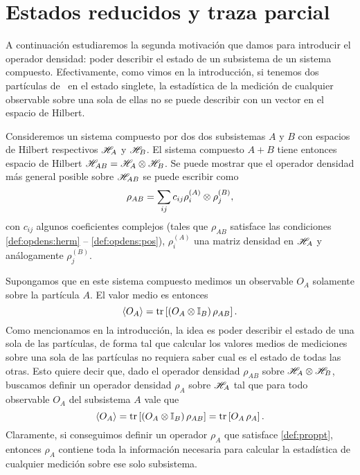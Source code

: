 \documentclass[10pt, a4paper]{article}
\numberwithin{equation}{subsection}
\begin{document}
\bigbreak


\bigbreak


\section{Estados reducidos y traza parcial}
A continuación estudiaremos la segunda motivación que damos para introducir el
operador densidad: poder describir el estado de un subsistema de un sistema
compuesto. Efectivamente, como vimos en la introducción, si tenemos dos
partículas de \spinhalf~en el estado singlete, la estadística de la medición de
cualquier observable sobre una sola de ellas no se puede describir con un
vector en el espacio de Hilbert.

Consideremos un sistema compuesto por dos dos subsistemas $A$ y $B$ con
espacios de Hilbert respectivos $\mathscr{H}_A$ y $\mathscr{H}_B$. El sistema
compuesto $A+B$ tiene entonces espacio de Hilbert $\mathscr{H}_{AB} =
\mathscr{H}_A\otimes\mathscr{H}_B$. Se puede mostrar que el operador densidad más
general posible sobre $\mathscr{H}_{AB}$ se puede escribir como
\begin{equation} \label{def:opdens:compgen}
  \rho_{AB} = \sum_{ij} c_{ij}\rho^{(A)}_{i}\otimes\rho^{(B)}_{j},
\end{equation}
con $c_{ij}$ algunos coeficientes complejos (tales que $\rho_{AB}$ satisface
las condiciones \eqref{def:opdens:herm} -- \eqref{def:opdens:pos}),
$\rho^{(A)}_{i}$ una matriz densidad en $\mathscr{H}_A$ y análogamente
$\rho^{(B)}_{j}$.

Supongamos que en este sistema compuesto medimos un observable $O_A$ solamente
sobre la partícula $A$. El valor medio es entonces
\begin{equation}
  \expval{O_A} = \tr\left[(O_A\otimes\mathbb{I}_B)\,\rho_{AB}\right].
\end{equation}
Como mencionamos en la introducción, la idea es poder describir el estado de
una sola de las partículas, de forma tal que calcular los valores medios de
mediciones sobre una sola de las partículas no requiera saber cual es el estado
de todas las otras. Esto quiere decir que, dado el operador densidad
$\rho_{AB}$ sobre $\mathscr{H}_{A}\otimes\mathscr{H}_{B}$, buscamos definir un
operador densidad $\rho_{A}$ sobre $\mathscr{H}_{A}$ tal que para todo observable
$O_A$ del subsistema $A$ vale que
\begin{equation} \label{def:proppt}
  \expval{O_A} = \tr\left[(O_A\otimes\mathbb{I}_B)\,\rho_{AB}\right] =
    \tr\left[O_A\,\rho_A\right].
\end{equation}
Claramente, si conseguimos definir un operador $\rho_A$ que satisface
\eqref{def:proppt}, entonces $\rho_A$ contiene toda la información necesaria
para calcular la estadística de cualquier medición sobre ese solo subsistema.
\end{document}
